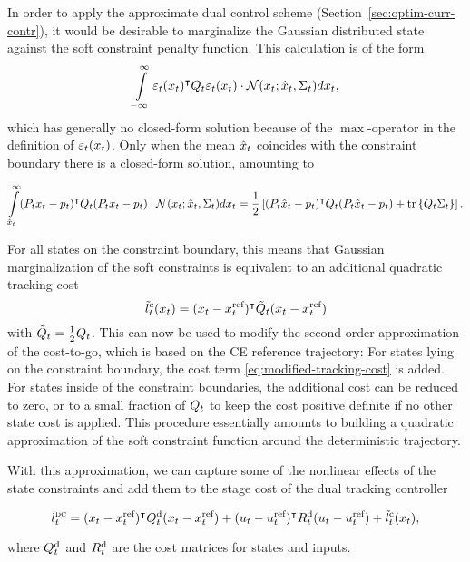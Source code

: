 In order to apply the approximate dual control scheme
(Section~\ref{sec:optim-curr-contr}), it would be desirable to marginalize the
Gaussian distributed state against the soft constraint penalty function. This
calculation is of the form
\begin{equation}
  \int\limits_{-\infty}^\infty \varepsilon_t(x_t)^{\intercal} Q_t \varepsilon_t(x_t)
\cdot \mathcal{N}(x_t; \hat x_t, \Sigma_t) dx_t,
\end{equation}
which has generally no closed-form solution because of the $\max$-operator in
the definition of $\varepsilon_t(x_t)$. Only when the mean $\hat x_t$ coincides
with the constraint boundary there is a closed-form solution, amounting to
\begin{fullwidth}\vspace{-\baselineskip}
\begin{equation}
  \int\limits_{\hat x_t}^\infty (P_t x_t - p_t )^{\intercal} Q_t (P_t x_t -
  p_t ) \cdot \mathcal{N}(x_t;
  \hat x_t, \Sigma_t) d{x_t}
  = \frac{1}{2}
  \left[ (P_t \hat x_t - p_t )^{\intercal} Q_t (P_t \hat x_t - p_t ) +
  \operatorname*{tr}\left\{{Q_t
  \Sigma_t}\right\} \right].
\end{equation}
\end{fullwidth}
For all states on the constraint boundary, this means that Gaussian
marginalization of the soft constraints is equivalent to an additional quadratic
tracking cost
\begin{equation}
  \label{eq:modified-tracking-cost}
  \tilde l^\text{c}_\tk(x_\tk) = (x_\tk - x_\tk^\text{ref})\T \tilde \SC_\tk
(x_\tk
 - x_\tk^\text{ref})
\end{equation}
with $\tilde {Q}_t = \frac{1}{2}Q_t$. This can now be used to modify the
second order approximation of the cost-to-go, which is based on the CE reference
trajectory: For states lying on the constraint boundary, the cost term
\eqref{eq:modified-tracking-cost} is added. For states inside of the constraint
boundaries, the additional cost can be reduced to zero, or to a small fraction
of $Q_t$ to keep the cost positive definite if no other state cost is
applied. This procedure essentially amounts to building a quadratic
approximation of the soft constraint function around the deterministic
trajectory.

With this approximation, we can capture some of the nonlinear effects of the
state constraints and add them to the stage cost of the dual tracking
controller
\begin{fullwidth}\vspace{-\baselineskip}
\begin{equation}
 l^{\normalfont\textsc{dc}}_t = (x_t - x_t^\text{ref})^{\intercal} Q^\text{d}_t (x_t
 - x_t^\text{ref}) + (u_t - u_t^\text{ref})^{\intercal} R^\text{d}_t (u_t -
u_t^\text{ref}) + \tilde l^\text{c}_t(x_t),
\end{equation}
\end{fullwidth}
where $Q_t^\text{d}$ and $R_t^\text{d}$ are the cost matrices for states
and inputs.

